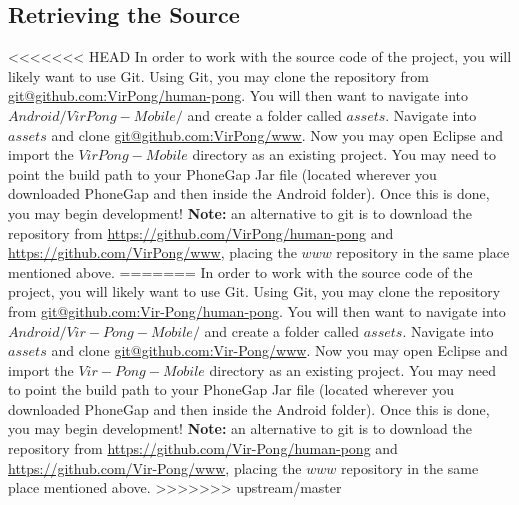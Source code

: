 \documentclass[12pt]{article}
\begin{document}
\begin{itemize}
\subsection{Retrieving the Source}
<<<<<<< HEAD
In order to work with the source code of the project, you will likely want to use Git\cite{Github}.  Using Git, you may clone the repository from \url{git@github.com:VirPong/human-pong}.  You will then want to navigate into $Android/VirPong-Mobile/$ and create a folder called $assets$.  Navigate into $assets$ and clone \url{git@github.com:VirPong/www}.  Now you may open Eclipse and import the $VirPong-Mobile$ directory as an existing project.  You may need to point the build path to your PhoneGap Jar file (located wherever you downloaded PhoneGap and then inside the Android folder).  Once this is done, you may begin development!  \textbf{Note:} an alternative to git is to download the repository from \url{https://github.com/VirPong/human-pong} and \url{https://github.com/VirPong/www}, placing the $www$ repository in the same place mentioned above.
=======
In order to work with the source code of the project, you will likely want to use Git\cite{Github}.  Using Git, you may clone the repository from \url{git@github.com:Vir-Pong/human-pong}.  You will then want to navigate into $Android/Vir-Pong-Mobile/$ and create a folder called $assets$.  Navigate into $assets$ and clone \url{git@github.com:Vir-Pong/www}.  Now you may open Eclipse and import the $Vir-Pong-Mobile$ directory as an existing project.  You may need to point the build path to your PhoneGap Jar file (located wherever you downloaded PhoneGap and then inside the Android folder).  Once this is done, you may begin development!  \textbf{Note:} an alternative to git is to download the repository from \url{https://github.com/Vir-Pong/human-pong} and \url{https://github.com/Vir-Pong/www}, placing the $www$ repository in the same place mentioned above.
>>>>>>> upstream/master


\end{itemize}
\end{document}
